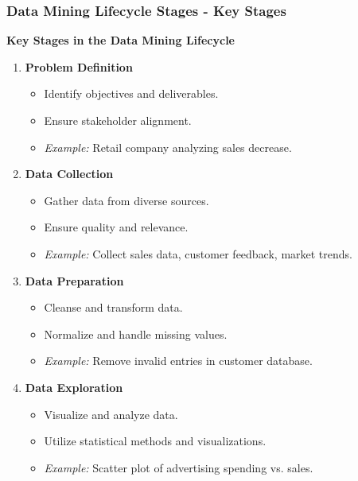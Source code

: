 \documentclass[aspectratio=169]{beamer}
\begin{document}
\begin{frame}[fragile]
    \frametitle{Data Mining Lifecycle Stages - Key Stages}
    \textbf{Key Stages in the Data Mining Lifecycle}

    \begin{enumerate}
        \item \textbf{Problem Definition}
        \begin{itemize}
            \item Identify objectives and deliverables.
            \item Ensure stakeholder alignment.
            \item \textit{Example:} Retail company analyzing sales decrease.
        \end{itemize}

        \item \textbf{Data Collection}
        \begin{itemize}
            \item Gather data from diverse sources.
            \item Ensure quality and relevance.
            \item \textit{Example:} Collect sales data, customer feedback, market trends.
        \end{itemize}

        \item \textbf{Data Preparation}
        \begin{itemize}
            \item Cleanse and transform data.
            \item Normalize and handle missing values.
            \item \textit{Example:} Remove invalid entries in customer database.
        \end{itemize}

        \item \textbf{Data Exploration}
        \begin{itemize}
            \item Visualize and analyze data.
            \item Utilize statistical methods and visualizations.
            \item \textit{Example:} Scatter plot of advertising spending vs. sales.
        \end{itemize}
    \end{enumerate}
\end{frame}
\end{document}
